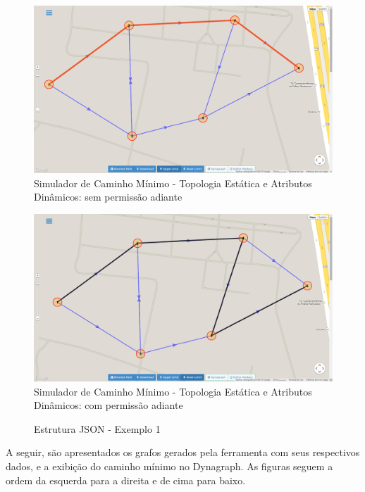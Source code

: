 \begin{figure}[htbp]
\centering
 \includegraphics[width=.90\textwidth]{figuras/validacao/upperlimit.png}
\caption{Simulador de Caminho Mínimo - Topologia Estática e Atributos Dinâmicos: sem permissão adiante}
\label{fig:upperlimit}
\end{figure}
\FloatBarrier

\begin{figure}[htbp]
\centering
 \includegraphics[width=.90\textwidth]{figuras/validacao/downlimit.png}
\caption{Simulador de Caminho Mínimo - Topologia Estática e Atributos Dinâmicos: com permissão adiante}
\label{fig:downlimit}
\end{figure}
\FloatBarrier


\begin{figure}[htbp]
  \caption{Estrutura JSON - Exemplo 1}
  \label{fig:jsondyn}
\end{figure}
\FloatBarrier

A seguir, são apresentados os grafos gerados pela ferramenta com seus respectivos dados,
e a exibição do caminho mínimo no Dynagraph. As figuras seguem a ordem da esquerda para a direita e
de cima para baixo.

